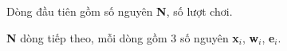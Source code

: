 Dòng đầu tiên gồm số nguyên \textbf{N}, số lượt chơi.

\textbf{N} dòng tiếp theo, mỗi dòng gồm 3 số nguyên \textbf{x$_i$}, \textbf{w$_i$}, \textbf{e$_i$}.